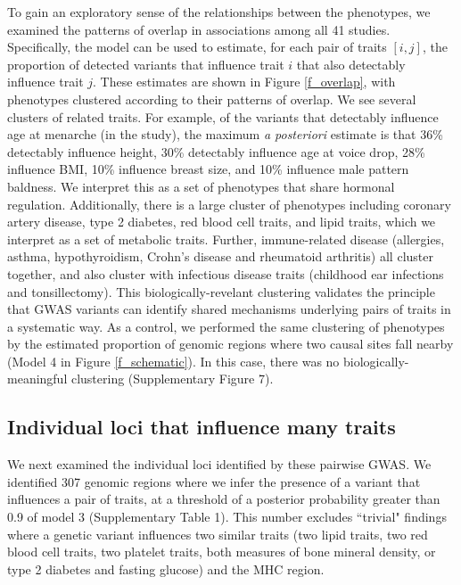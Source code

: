 \documentclass[11pt,titlepage]{article}
\begin{document}
To gain an exploratory sense of the relationships between the phenotypes, we examined the patterns of overlap in associations among all 41 studies. 
Specifically, the model can be used to estimate, for each pair of traits $[i,j]$, the proportion of detected variants that influence trait $i$ that also detectably influence trait $j$.
These estimates are shown in Figure \ref{f_overlap}, with phenotypes clustered according to their patterns of overlap. 
We see several clusters of related traits. 
For example, of the variants that detectably influence age at menarche (in the \citet{Perry:2014aa} study), the maximum \emph{a posteriori} estimate is that 36\% detectably influence height, 30\% detectably influence age at voice drop, 28\% influence BMI, 10\% influence breast size, and 10\% influence male pattern baldness. 
We interpret this as a set of phenotypes that share hormonal regulation. 
Additionally, there is a large cluster of phenotypes including coronary artery disease, type 2 diabetes, red blood cell traits, and lipid traits, which we interpret as a set of metabolic traits.
Further, immune-related disease (allergies, asthma, hypothyroidism, Crohn's disease and rheumatoid arthritis) all cluster together, and also cluster with infectious disease traits (childhood ear infections and tonsillectomy). 
This biologically-revelant clustering validates the principle that GWAS variants can identify shared mechanisms underlying pairs of traits in a systematic way.
As a control, we performed the same clustering of phenotypes by the estimated proportion of genomic regions where two causal sites fall nearby (Model 4 in Figure \ref{f_schematic}).
In this case, there was no biologically-meaningful clustering (Supplementary Figure 7).


\subsection{Individual loci that influence many traits}
We next examined the individual loci identified by these pairwise GWAS.
We identified 307 genomic regions where we infer the presence of a variant that influences a pair of traits, at a threshold of a posterior probability greater than 0.9 of model 3 (Supplementary Table 1). 
This number excludes ``trivial" findings where a genetic variant influences two similar traits (two lipid traits, two red blood cell traits, two platelet traits, both measures of bone mineral density, or type 2 diabetes and fasting glucose) and the MHC region.
 
\end{document}
